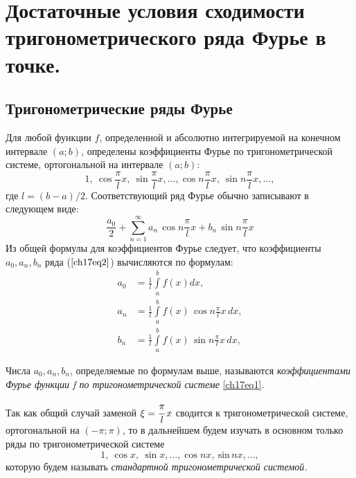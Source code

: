 \chapter{Достаточные условия сходимости тригонометрического ряда Фурье в точке.}
\section{Тригонометрические ряды Фурье}
Для любой функции $f$, определенной и абсолютно интегрируемой на конечном интервале $(a;b)$, определены коэффициенты Фурье по тригонометрической системе, ортогональной на интервале $(a;b)$:
\begin{equation} \label{ch17eq1}
1,\ \cos \frac{\pi}{l}x,\ \sin \frac{\pi}{l}x,\ldots,\cos n\frac{\pi}{l}x,\ \sin n\frac{\pi}{l}x,\ldots,
\end{equation}
где $l = (b - a)/2$. Соответствующий ряд Фурье обычно записывают в следующем виде:
\begin{equation} \label{ch17eq2}
\frac{a_0}{2} + \sum_{n = 1}^{\infty} a_{n}\,\cos n\frac{\pi}{l}x + b_{n}\, \sin n\frac{\pi}{l}x
\end{equation}
Из общей формулы для коэффициентов Фурье следует, что коэффициенты $a_0, a_n, b_n$ ряда ($\ref{ch17eq2}$) вычисляются по формулам:
\begin{align} \label{ch17eq3}
a_0 &= \frac{1}{l} \int\limits_{a}^{b} f(x)dx,\\
a_n &= \frac{1}{l} \int\limits_{a}^{b} f(x)\,\cos n\frac{\pi}{l}x\, dx,\\
b_n &= \frac{1}{l} \int\limits_{a}^{b} f(x)\,\sin n\frac{\pi}{l}x\, dx,
\end{align}

\begin{defn}
Числа $a_0, a_n, b_n$, определяемые по формулам выше, называются \textit{коэффициентами Фурье функции f по тригонометрической системе} \eqref{ch17eq1}.
\end{defn}

Так как общий случай заменой $\xi = \cfrac{\pi}{l}\, x$ сводится к тригонометрической системе, ортогональной на $(-\pi;\pi)$, то в дальнейшем будем изучать в основном только ряды по тригонометрической системе
$$
1,\ \cos x,\ \sin x,\ldots,\cos nx,\ \text{sin}\, nx,\ldots,
$$
которую будем называть \textit{стандартной тригонометрической системой.}


